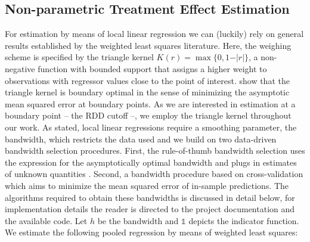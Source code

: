 \subsection{Non-parametric Treatment Effect Estimation} %
\label{sec: non-param}
For estimation by means of local linear regression we can (luckily) rely on general results established by the weighted least squares literature. Here, the weighing scheme is specified by the triangle kernel $K(r) = \max \lbrace 0, 1 - \vert r \vert \rbrace$, a non-negative function with bounded support that assigns a higher weight to observations with regressor values close to the point of interest. \cite{cheng_et_al_1997} show that the triangle kernel is boundary optimal in the sense of minimizing the asymptotic mean squared error at boundary points. As we are interested in estimation at a boundary point -- the RDD cutoff --, we employ the triangle kernel throughout our work. As stated, local linear regressions require a smoothing parameter, the bandwidth, which restricts the data used and we build on two data-driven bandwidth selection procedures. First, the rule-of-thumb bandwidth selection uses the expression for the asymptotically optimal bandwidth and plugs in estimates of unknown quantities \cite{fan_gij_1996}. Second, a bandwidth procedure based on cross-validation which aims to minimize the mean squared error of in-sample predictions. The algorithms required to obtain these bandwidths is discussed in detail below, for implementation details the reader is directed to the project documentation and the available code. Let $h$ be the bandwidth and $\mathds{1}$ depicts the indicator function. We estimate the following pooled regression by means of weighted least squares:


